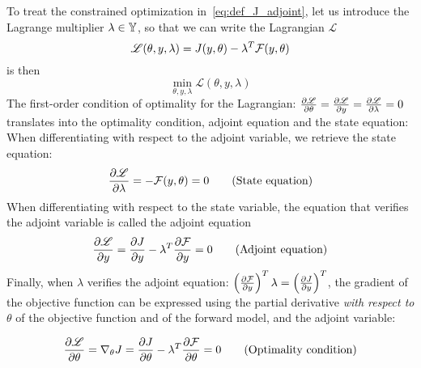 \documentclass[../../Main_ManuscritThese.tex]{subfiles}
\begin{document}
To treat the constrained optimization in~\cref{eq:def_J_adjoint}, let us introduce the Lagrange multiplier $\lambda \in \mathbb{Y}$, so that we can write the Lagrangian $\mathscr{L}$
\begin{equation}
  \mathscr{L}(\theta, y, \lambda) = J(y,\theta) - \lambda^T \mathcal{F}(y, \theta)
\end{equation}
 is then
\begin{equation}
  \min_{\theta,y,\lambda} \mathscr{L}(\theta,y,\lambda)
\end{equation}
The first-order condition of optimality for the Lagrangian:
$\frac{\partial \mathscr{L}}{\partial \theta} = \frac{\partial \mathscr{L}}{\partial y} =
\frac{\partial \mathscr{L}}{\partial \lambda} = 0$ translates into the optimality
condition, adjoint equation and the state equation: When
differentiating with respect to the adjoint variable, we retrieve the
state equation:
\begin{equation}
  \frac{\partial \mathscr{L}}{\partial \lambda} = - \mathcal{F}(y,\theta) = 0 \tag{State equation}
\end{equation}
When differentiating with respect to the state variable, the equation that verifies the adjoint variable is called the adjoint equation
\begin{equation}
  \frac{\partial \mathscr{L}}{\partial y} = \frac{\partial J}{\partial y} - \lambda^T \frac{\partial \mathcal{F}}{\partial y}= 0  \tag{Adjoint equation}
\end{equation}
Finally, when $\lambda$ verifies the adjoint equation: $ \left(\frac{\partial \mathcal{F}}{\partial y}\right)^T\lambda= \left(\frac{\partial J}{\partial y}\right)^T$, the gradient of the objective function can be expressed using the partial derivative \emph{with respect to $\theta$} of the objective function and of the forward model, and the adjoint variable:

\begin{equation}
    \pfrac{\mathscr{L}}{\theta} = \nabla_\theta J %
                               = \pfrac{J}{\theta} - \innerprod{\lambda}{\pfrac{\mathcal{F}}{\theta}} = 0 \tag{Optimality condition}
\end{equation}
\end{document}
